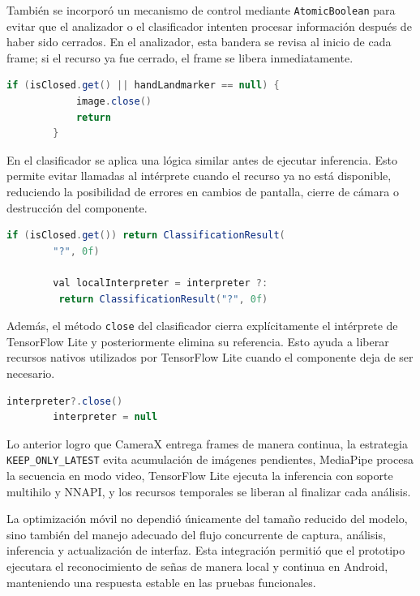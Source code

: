 	También se incorporó un mecanismo de control mediante \texttt{AtomicBoolean} para evitar que el analizador o el clasificador intenten procesar información después de haber sido cerrados. En el analizador, esta bandera se revisa al inicio de cada frame; si el recurso ya fue cerrado, el frame se libera inmediatamente.
	
	\begin{lstlisting}[language=Java]
		if (isClosed.get() || handLandmarker == null) {
			image.close()
			return
		}
	\end{lstlisting}
	
	En el clasificador se aplica una lógica similar antes de ejecutar inferencia. Esto permite evitar llamadas al intérprete cuando el recurso ya no está disponible, reduciendo la posibilidad de errores en cambios de pantalla, cierre de cámara o destrucción del componente.
	
	\begin{lstlisting}[language=Java]
		if (isClosed.get()) return ClassificationResult(
		"?", 0f)
		
		val localInterpreter = interpreter ?:
		 return ClassificationResult("?", 0f)
	\end{lstlisting}
	
	Además, el método \texttt{close} del clasificador cierra explícitamente el intérprete de TensorFlow Lite y posteriormente elimina su referencia. Esto ayuda a liberar recursos nativos utilizados por TensorFlow Lite cuando el componente deja de ser necesario.
	
	\begin{lstlisting}[language=Java]
		interpreter?.close()
		interpreter = null
	\end{lstlisting}
	
	Lo anterior logro que CameraX entrega frames de manera continua, la estrategia \texttt{KEEP\_ONLY\_LATEST} evita acumulación de imágenes pendientes, MediaPipe procesa la secuencia en modo video, TensorFlow Lite ejecuta la inferencia con soporte multihilo y NNAPI, y los recursos temporales se liberan al finalizar cada análisis.
	
	La optimización móvil no dependió únicamente del tamaño reducido del modelo, sino también del manejo adecuado del flujo concurrente de captura, análisis, inferencia y actualización de interfaz. Esta integración permitió que el prototipo ejecutara el reconocimiento de señas de manera local y continua en Android, manteniendo una respuesta estable en las pruebas funcionales.
	
